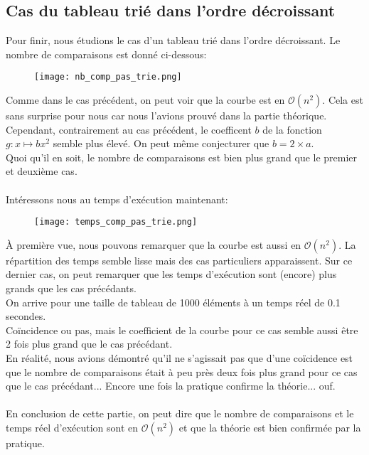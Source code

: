 \documentclass[a4paper,12pt]{article}
\begin{document}
\subsection{Cas du tableau trié dans l'ordre décroissant}
Pour finir, nous étudions le cas d'un tableau trié dans l'ordre décroissant. Le nombre de comparaisons est donné ci-dessous:
\newpage
\begin{figure}[!h]
  \centering
  \texttt{[image: nb\_comp\_pas\_trie.png]}
\end{figure}
Comme dans le cas précédent, on peut voir que la courbe est en $\mathcal{O}(n^2)$. Cela est sans surprise pour nous car nous l'avions prouvé dans la partie théorique. Cependant, contrairement au cas précédent, le coefficent $b$ de la fonction $g:x \mapsto bx^2$ semble plus élevé. On peut même conjecturer que $b = 2 \times a$. \\
Quoi qu'il en soit, le nombre de comparaisons est bien plus grand que le premier et deuxième cas. \\\\
Intéressons nous au temps d'exécution maintenant:
\begin{figure}[!h]
  \centering
  \texttt{[image: temps\_comp\_pas\_trie.png]}
\end{figure}
\newpage
À première vue, nous pouvons remarquer que la courbe est aussi en $\mathcal{O}(n^2)$. La répartition des temps semble lisse mais des cas particuliers apparaissent. Sur ce dernier cas, on peut remarquer que les temps d'exécution sont (encore) plus grands que les cas précédants. \\
On arrive pour une taille de tableau de 1000 éléments à un temps réel de 0.1 secondes. \\
Coïncidence ou pas, mais le coefficient de la courbe pour ce cas semble aussi être 2 fois plus grand que le cas précédant. \\
En réalité, nous avions démontré qu'il ne s'agissait pas que d'une coïcidence est que le nombre de comparaisons était à peu près deux fois plus grand pour ce cas que le cas précédant... Encore une fois la pratique confirme la théorie... ouf. \\ \\
En conclusion de cette partie, on peut dire que le nombre de comparaisons et le temps réel d'exécution sont en $\mathcal{O}(n^2)$ et que la théorie est bien confirmée par la pratique.
\end{document}
